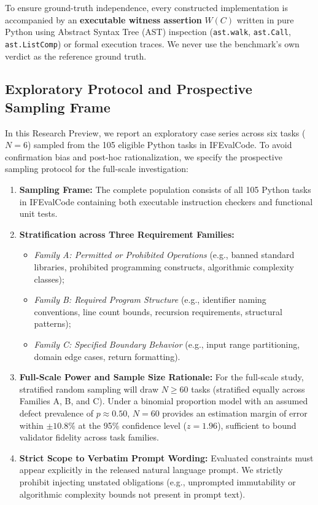 \documentclass[runningheads]{llncs}
\begin{document}
To ensure ground-truth independence, every constructed implementation is accompanied by an \textbf{executable witness assertion} $W(C)$ written in pure Python using Abstract Syntax Tree (AST) inspection (\texttt{ast.walk}, \texttt{ast.Call}, \texttt{ast.ListComp}) or formal execution traces. We never use the benchmark's own verdict as the reference ground truth.

\subsection{Exploratory Protocol and Prospective Sampling Frame}
In this Research Preview, we report an exploratory case series across six tasks ($N=6$) sampled from the 105 eligible Python tasks in IFEvalCode. To avoid confirmation bias and post-hoc rationalization, we specify the prospective sampling protocol for the full-scale investigation:
\begin{enumerate}[leftmargin=*]
    \item \textbf{Sampling Frame:} The complete population consists of all 105 Python tasks in IFEvalCode containing both executable instruction checkers and functional unit tests.
    \item \textbf{Stratification across Three Requirement Families:}
    \begin{itemize}
        \item \emph{Family A: Permitted or Prohibited Operations} (e.g., banned standard libraries, prohibited programming constructs, algorithmic complexity classes);
        \item \emph{Family B: Required Program Structure} (e.g., identifier naming conventions, line count bounds, recursion requirements, structural patterns);
        \item \emph{Family C: Specified Boundary Behavior} (e.g., input range partitioning, domain edge cases, return formatting).
    \end{itemize}
    \item \textbf{Full-Scale Power and Sample Size Rationale:} For the full-scale study, stratified random sampling will draw $N \ge 60$ tasks (stratified equally across Families A, B, and C). Under a binomial proportion model with an assumed defect prevalence of $p \approx 0.50$, $N = 60$ provides an estimation margin of error within $\pm 10.8\%$ at the 95\% confidence level ($z = 1.96$), sufficient to bound validator fidelity across task families.
    \item \textbf{Strict Scope to Verbatim Prompt Wording:} Evaluated constraints must appear explicitly in the released natural language prompt. We strictly prohibit injecting unstated obligations (e.g., unprompted immutability or algorithmic complexity bounds not present in prompt text).
\end{enumerate}
\end{document}
